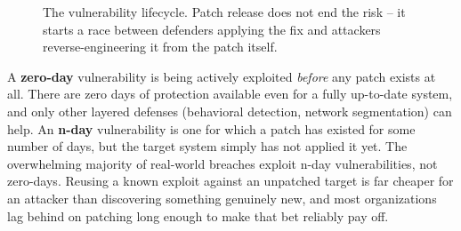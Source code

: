 \begin{figure}[h]
\centering
{}
\caption{The vulnerability lifecycle. Patch release does not end the risk -- it starts a race
between defenders applying the fix and attackers reverse-engineering it from the patch itself.}
\label{fig:4.3-vuln-lifecycle}
\end{figure}

\begin{example}
A \textbf{zero-day} vulnerability is being actively exploited \emph{before} any patch exists at
all. There are zero days of protection available even for a fully up-to-date system, and only
other layered defenses (behavioral detection, network segmentation) can help. An \textbf{n-day}
vulnerability is one for which a patch has existed for some number of days, but the target system
simply has not applied it yet. The overwhelming majority of real-world breaches exploit n-day
vulnerabilities, not zero-days. Reusing a known exploit against an unpatched target is far cheaper
for an attacker than discovering something genuinely new, and most organizations lag behind on
patching long enough to make that bet reliably pay off.
\end{example}

